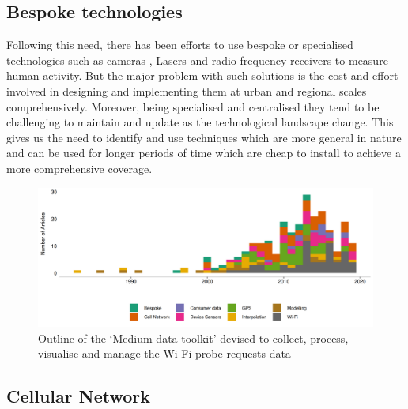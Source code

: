 \subsection{Bespoke technologies}

Following this need, there has been efforts to use bespoke or specialised technologies such as cameras \citep{cai1996, heikkila2004, krockel2012}, Lasers \citep{zhao2005, arras2008} and radio frequency receivers  \citep{bahl2000, yang2013, chothia2010, bulusu2000, dil2011} to measure human activity.
But the major problem with such solutions is the cost and effort involved in designing and implementing them at urban and regional scales comprehensively.
Moreover, being specialised and centralised they tend to be challenging to maintain and update as the technological landscape change.
This gives us the need to identify and use techniques which are more general in nature and can be used for longer periods of time which are cheap to install to achieve a more comprehensive coverage.

\begin{figure}
  \includegraphics{images/literature-tech-timeline.png}
  \caption{Outline of the `Medium data toolkit' devised to collect, process, visualise and manage the Wi-Fi probe requests data}
  \label{figure:literature:tech:timeline}
\end{figure}


\subsection{Cellular Network}

